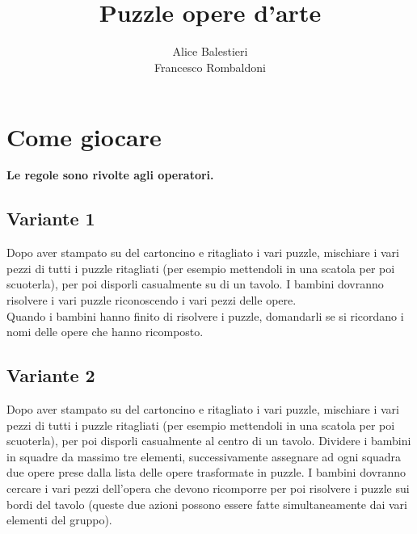 \documentclass[hidelinks,12pt,a4paper]{article}
\begin{document}
	
	\title{\textbf{\\Puzzle opere d'arte}}
	\author{Alice Balestieri\\Francesco Rombaldoni}
	\date{}
	
	\maketitle
	\newpage
	
	\tableofcontents
	\newpage
	
	\section{Come giocare}
	\begin{center}
		\textbf{Le regole sono rivolte agli operatori.}
	\end{center}
	
	\subsection{Variante 1}
	Dopo aver stampato su del cartoncino e ritagliato i vari puzzle, mischiare i vari pezzi di tutti i puzzle ritagliati (per esempio mettendoli in una scatola per poi scuoterla), per poi disporli casualmente su di un tavolo. I bambini dovranno risolvere i vari puzzle riconoscendo i vari pezzi delle opere.\\
	Quando i bambini hanno finito di risolvere i puzzle, domandarli se si ricordano i nomi delle opere che hanno ricomposto.
	
	\subsection{Variante 2}
	Dopo aver stampato su del cartoncino e ritagliato i vari puzzle, mischiare i vari pezzi di tutti i puzzle ritagliati (per esempio mettendoli in una scatola per poi scuoterla), per poi disporli casualmente al centro di un tavolo. Dividere i bambini in squadre da massimo tre elementi, successivamente assegnare ad ogni squadra due opere prese dalla lista delle opere trasformate in puzzle. I bambini dovranno cercare i vari pezzi dell'opera che devono ricomporre per poi risolvere i puzzle sui bordi del tavolo (queste due azioni possono essere fatte simultaneamente dai vari elementi del gruppo).
	
\end{document}
